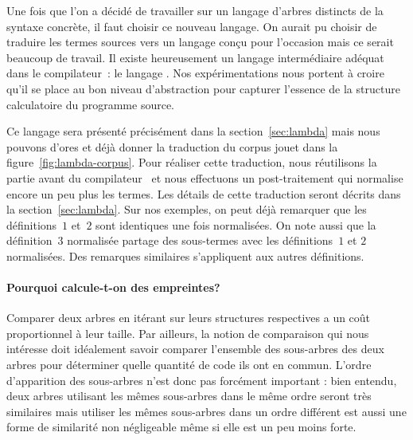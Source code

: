 Une fois que l'on a décidé de travailler sur un langage d'arbres
distincts de la syntaxe concrète, il faut choisir ce nouveau langage.
On aurait pu choisir de traduire les termes sources vers un langage
conçu pour l'occasion mais ce serait beaucoup de travail. Il existe
heureusement un langage intermédiaire adéquat dans le
compilateur~{\OCaml}: le langage {\LambdaCode}. Nos expérimentations
nous portent à croire qu'il se place au bon niveau d'abstraction pour
capturer l'essence de la structure calculatoire du programme source.

Ce langage sera présenté précisément dans la section~\ref{sec:lambda}
mais nous pouvons d'ores et déjà donner la traduction du corpus jouet
dans la figure~\ref{fig:lambda-corpus}. Pour réaliser cette
traduction, nous réutilisons la partie avant du compilateur~{\OCaml}
et nous effectuons un post-traitement qui normalise encore un peu plus
les termes. Les détails de cette traduction seront décrits dans la
section~\ref{sec:lambda}. Sur nos exemples, on peut déjà
remarquer que les définitions~$1$ et~$2$ sont identiques une fois
normalisées. On note aussi que la définition~$3$ normalisée partage
des sous-termes avec les définitions~$1$ et $2$ normalisées. Des
remarques similaires s'appliquent aux autres définitions.



\paragraph{Pourquoi calcule-t-on des empreintes?}

Comparer deux arbres en itérant sur leurs structures respectives a un
coût proportionnel à leur taille. Par ailleurs, la notion de
comparaison qui nous intéresse doit idéalement savoir comparer
l'ensemble des sous-arbres des deux arbres pour déterminer quelle
quantité de code ils ont en commun. L'ordre d'apparition des
sous-arbres n'est donc pas forcément important : bien entendu, deux
arbres utilisant les mêmes sous-arbres dans le même ordre seront très
similaires mais utiliser les mêmes sous-arbres dans un ordre différent
est aussi une forme de similarité non négligeable même si elle est un
peu moins forte.

